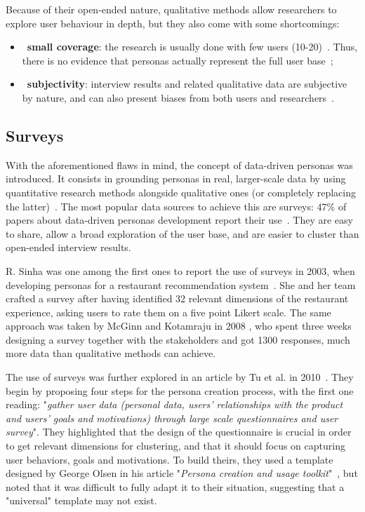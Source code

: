 Because of their open-ended nature, qualitative methods allow researchers to explore user behaviour in depth, but they also come with some shortcomings:
\begin{itemize}
    \item~\textbf{small coverage}: the research is usually done with few users (10-20)~\cite{mulder2007approaches}. Thus, there is no evidence that personas actually represent the full user base~\cite{chapman2006personas};
    \item~\textbf{subjectivity}: interview results and related qualitative data are subjective by nature, and can also present biases from both users and researchers~\cite{mulder2007approaches}.
\end{itemize}

\subsection{Surveys}
\label{subsec:surveys}
With the aforementioned flaws in mind, the concept of data-driven personas was introduced. It consists in grounding personas in real, larger-scale data by using quantitative research methods alongside qualitative ones (or completely replacing the latter)~\cite{mulder2007approaches}. The most popular data sources to achieve this are surveys: 47\% of papers about data-driven personas development report their use~\cite{salminen2021survey}. They are easy to share, allow a broad exploration of the user base, and are easier to cluster than open-ended interview results.

R. Sinha was one among the first ones to report the use of surveys in 2003, when developing personas for a restaurant recommendation system~\cite{sinha2003persona}. She and her team crafted a survey after having identified 32 relevant dimensions of the restaurant experience, asking users to rate them on a five point Likert scale. The same approach was taken by McGinn and Kotamraju in 2008 \cite{mcginn2008data}, who spent three weeks designing a survey together with the stakeholders and got 1300 responses, much more data than qualitative methods can achieve. 

The use of surveys was further explored in an article by Tu et al. in 2010~\cite{tu2010combine}. They begin by proposing four steps for the persona creation process, with the first one reading: "\textit{gather user data (personal data, users' relationships with the product and users' goals and motivations) through large scale questionnaires and user survey}". They highlighted that the design of the questionnaire is crucial in order to get relevant dimensions for clustering, and that it should focus on capturing user behaviors, goals and motivations. To build theirs, they used a template designed by George Olsen in his article "\textit{Persona creation and usage toolkit}"~\cite{olsen2004persona}, but noted that it was difficult to fully adapt it to their situation, suggesting that a "universal" template may not exist.

